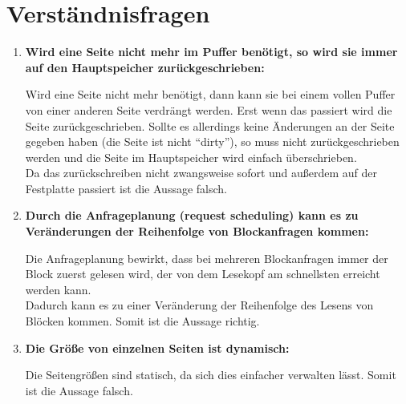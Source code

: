 \documentclass{scrartcl}
\begin{document}
\maketitle

\section{Verständnisfragen}
\begin{enumerate}
    \item \textbf{Wird eine Seite nicht mehr im Puffer benötigt, so wird sie immer auf den Hauptspeicher zurückgeschrieben:}
    
    Wird eine Seite nicht mehr benötigt, dann kann sie bei einem vollen Puffer von einer anderen Seite verdrängt werden. Erst wenn das passiert wird die Seite zurückgeschrieben. Sollte es allerdings keine Änderungen an der Seite gegeben haben (die Seite ist nicht ``dirty''), so muss nicht zurückgeschrieben werden und die Seite im Hauptspeicher wird einfach überschrieben.\\Da das zurückschreiben nicht zwangsweise sofort und außerdem auf der Festplatte passiert ist die Aussage falsch.
    \item \textbf{Durch die Anfrageplanung (request scheduling) kann es zu Veränderungen der Reihenfolge von Blockanfragen kommen:}
    
    Die Anfrageplanung bewirkt, dass bei mehreren Blockanfragen immer der Block zuerst gelesen wird, der von dem Lesekopf am schnellsten erreicht werden kann. \\
    Dadurch kann es zu einer Veränderung der Reihenfolge des Lesens von Blöcken kommen. Somit ist die Aussage richtig. 
    \item \textbf{Die Größe von einzelnen Seiten ist dynamisch:}
    
    Die Seitengrößen sind statisch, da sich dies einfacher verwalten lässt. Somit ist die Aussage falsch.
\end{enumerate}
\end{document}
